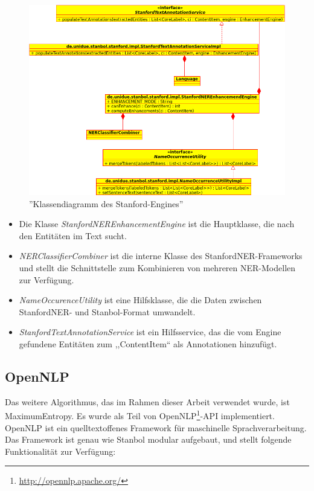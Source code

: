 \begin{figure}[ht]
\centering
\includegraphics[width=\textwidth]{Bilder/stanford-classes.png}
\caption{''Klassendiagramm  des Stanford-Engines''}
\label{fig:stanfclasses}
\end{figure}
\begin{itemize}
\item Die Klasse \textit{StanfordNEREnhancementEngine} ist die Hauptklasse, die nach den Entitäten im Text sucht.
\item \textit{NERClassifierCombiner} ist die interne Klasse des StanfordNER-Frameworks und stellt die Schnittstelle zum Kombinieren von mehreren NER-Modellen zur Verfügung.
\item \textit{NameOccurenceUtility} ist eine Hilfsklasse, die die Daten zwischen StanfordNER- und Stanbol-Format umwandelt.
\item \textit{StanfordTextAnnotationService} ist ein Hilfsservice, das die vom Engine gefundene Entitäten	zum ,,ContentItem`` als Annotationen hinzufügt.
\end{itemize}

\subsection{OpenNLP}
Das weitere Algorithmus, das im Rahmen dieser Arbeit verwendet wurde, ist MaximumEntropy. Es wurde als Teil von OpenNLP\footnote{\url{http://opennlp.apache.org/}}-API implementiert. OpenNLP ist ein quelltextoffenes Framework für maschinelle Sprachverarbeitung. Das Framework ist genau wie Stanbol modular aufgebaut, und stellt folgende Funktionalität zur Verfügung:


